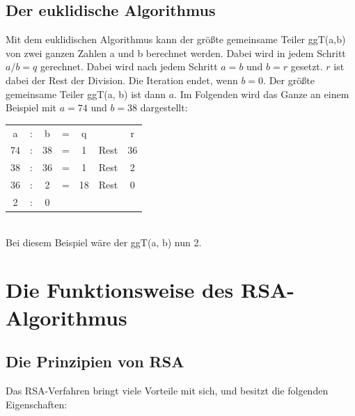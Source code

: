 \documentclass[12pt,a4paper]{scrartcl}
\begin{document}
	\subsection{Der euklidische Algorithmus}
	 Mit dem euklidischen Algorithmus kann der größte gemeinsame Teiler ggT(a,b) von zwei ganzen Zahlen a und b berechnet werden.
	 Dabei wird in jedem Schritt $a / b = q$ gerechnet. Dabei wird nach jedem Schritt $a=b$ und $b = r$ gesetzt. $r$ ist dabei der Rest der Division. Die Iteration endet, wenn $b=0$. Der größte gemeinsame Teiler ggT(a, b) ist dann $a$. \cite[S.94f]{teschl2008mathematik} Im Folgenden wird das Ganze an einem Beispiel mit $a = 74$ und $b = 38$ dargestellt: \\
	 \begin{tabular}{ c c c c c c c}
 		a & : & b & = & q & & r \\ 
 		74 & : & 38 & = & 1 & Rest & 36\\ 
 		38 & : & 36 & = & 1 & Rest & 2\\ 
 		36 & : & 2 & = & 18 & Rest & 0\\
 		2 & : & 0 & \\
	\end{tabular}\\
	Bei diesem Beispiel wäre der ggT(a, b) nun 2.
	
\pagebreak
\section{Die Funktionsweise des RSA-Algorithmus}
	\subsection{Die Prinzipien von RSA}
	Das RSA-Verfahren bringt viele Vorteile mit sich, und besitzt die folgenden Eigenschaften:
	
\end{document}
